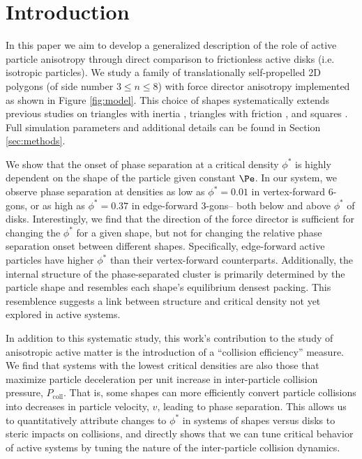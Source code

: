 \section{Introduction}

In this paper we aim to develop a generalized description of the role of active particle anisotropy through direct comparison to frictionless active disks (i.e. isotropic particles).
We study a family of translationally self-propelled 2D polygons (of side number $3{\leq}n{\leq}8$) with force director anisotropy implemented as shown in Figure \ref{fig:model}.
This choice of shapes systematically extends previous studies on triangles with inertia \cite{Wensink_2014_PRE}, triangles with friction \cite{Ilse_2016_JChemPhys}, and squares \cite{Prymidis_2016_SoftMatter}.
Full simulation parameters and additional details can be found in Section \ref{sec:methods}.

We show that the onset of phase separation at a critical density $\phi^*$ is highly dependent on the shape of the particle given constant $\Pe$.
In our system, we observe phase separation at densities as low as $\phi^*=0.01$ in vertex-forward 6-gons, or as high as $\phi^*=0.37$ in edge-forward 3-gons-- both below and above $\phi^*$ of disks.
Interestingly, we find that the direction of the force director is sufficient for changing the $\phi^*$ for a given shape, but not for changing the relative phase separation onset between different shapes.
Specifically, edge-forward active particles have higher $\phi^*$ than their vertex-forward counterparts.
Additionally, the internal structure of the phase-separated cluster is primarily determined by the particle shape and resembles each shape's equilibrium densest packing.
This resemblence suggests a link between structure and critical density not yet explored in active systems.

In addition to this systematic study, this work's contribution to the study of anisotropic active matter is the introduction of a ``collision efficiency'' measure.
We find that systems with the lowest critical densities are also those that maximize particle deceleration per unit increase in inter-particle collision pressure, $P_\text{coll}$.
That is, some shapes can more efficiently convert particle collisions into decreases in particle velocity, $v$, leading to phase separation.
This allows us to quantitatively attribute changes to $\phi^*$ in systems of shapes versus disks to steric impacts on collisions, and directly shows that we can tune critical behavior of active systems by tuning the nature of the inter-particle collision dynamics.

